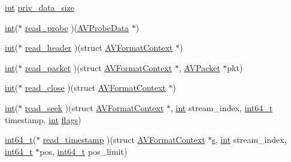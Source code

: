 \begin{DoxyCompactItemize}
\item 
\hyperlink{xmltok_8h_a5a0d4a5641ce434f1d23533f2b2e6653}{int} \hyperlink{struct_a_v_input_format_a195b445886775084b8e075062d33f09a}{priv\+\_\+data\+\_\+size}
\item 
\hyperlink{xmltok_8h_a5a0d4a5641ce434f1d23533f2b2e6653}{int}($\ast$ \hyperlink{struct_a_v_input_format_a2e272c7785fdd26895b1af1867b62567}{read\+\_\+probe} )(\hyperlink{struct_a_v_probe_data}{A\+V\+Probe\+Data} $\ast$)
\item 
\hyperlink{xmltok_8h_a5a0d4a5641ce434f1d23533f2b2e6653}{int}($\ast$ \hyperlink{struct_a_v_input_format_a286d65d159570516e5ed38fcbb842d5a}{read\+\_\+header} )(struct \hyperlink{struct_a_v_format_context}{A\+V\+Format\+Context} $\ast$)
\item 
\hyperlink{xmltok_8h_a5a0d4a5641ce434f1d23533f2b2e6653}{int}($\ast$ \hyperlink{struct_a_v_input_format_aef741db739cb5af755f01f2a818b61a7}{read\+\_\+packet} )(struct \hyperlink{struct_a_v_format_context}{A\+V\+Format\+Context} $\ast$, \hyperlink{struct_a_v_packet}{A\+V\+Packet} $\ast$pkt)
\item 
\hyperlink{xmltok_8h_a5a0d4a5641ce434f1d23533f2b2e6653}{int}($\ast$ \hyperlink{struct_a_v_input_format_a725b4fbd5a28109d255d272f46efac90}{read\+\_\+close} )(struct \hyperlink{struct_a_v_format_context}{A\+V\+Format\+Context} $\ast$)
\item 
\hyperlink{xmltok_8h_a5a0d4a5641ce434f1d23533f2b2e6653}{int}($\ast$ \hyperlink{struct_a_v_input_format_a04a3b9ba459666bdb43628c472fa29bf}{read\+\_\+seek} )(struct \hyperlink{struct_a_v_format_context}{A\+V\+Format\+Context} $\ast$, \hyperlink{xmltok_8h_a5a0d4a5641ce434f1d23533f2b2e6653}{int} stream\+\_\+index, \hyperlink{lib-src_2ffmpeg_2win32_2stdint_8h_a67a9885ef4908cb72ce26d75b694386c}{int64\+\_\+t} timestamp, \hyperlink{xmltok_8h_a5a0d4a5641ce434f1d23533f2b2e6653}{int} \hyperlink{struct_a_v_input_format_a1b30f6647d0c2faf38ba8786d7c3a838}{flags})
\item 
\hyperlink{lib-src_2ffmpeg_2win32_2stdint_8h_a67a9885ef4908cb72ce26d75b694386c}{int64\+\_\+t}($\ast$ \hyperlink{struct_a_v_input_format_ab071640466e60eddc4eee43385fb22fd}{read\+\_\+timestamp} )(struct \hyperlink{struct_a_v_format_context}{A\+V\+Format\+Context} $\ast$\hyperlink{lib_2expat_8h_a755339d27872b13735c2cab829e47157}{s}, \hyperlink{xmltok_8h_a5a0d4a5641ce434f1d23533f2b2e6653}{int} stream\+\_\+index, \hyperlink{lib-src_2ffmpeg_2win32_2stdint_8h_a67a9885ef4908cb72ce26d75b694386c}{int64\+\_\+t} $\ast$pos, \hyperlink{lib-src_2ffmpeg_2win32_2stdint_8h_a67a9885ef4908cb72ce26d75b694386c}{int64\+\_\+t} pos\+\_\+limit)

\end{DoxyCompactItemize}
